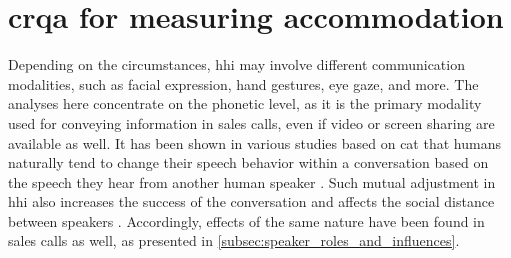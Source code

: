 \section[\Acl{crqa}]{\Acl{crqa} for measuring accommodation}
\label{sec:crqa}

Depending on the circumstances, \ac{hhi} may involve different communication modalities, such as facial expression, hand gestures, eye gaze, and more.
The analyses here concentrate on the phonetic level, as it is the primary modality used for conveying information in sales calls, even if video or screen sharing are available as well.
It has been shown in various studies based on \ac{cat} \citep[][and cf.\ \cref{sec:communication_accommodation_theory}]{Giles1991CAT, Gallois2015CAT} that humans naturally tend to change their speech behavior within a conversation based on the speech they hear from another human speaker \citep[see, e.g.][]{Bailly2010speech, Babel2014novelty}.
Such mutual adjustment in \ac{hhi} also increases the success of the conversation \citep{Pickering2004behavioral} and affects the social distance between speakers \citep{Schweitzer2017social}.
Accordingly, effects of the same nature have been found in sales calls as well, as presented in \cref{subsec:speaker_roles_and_influences}.

